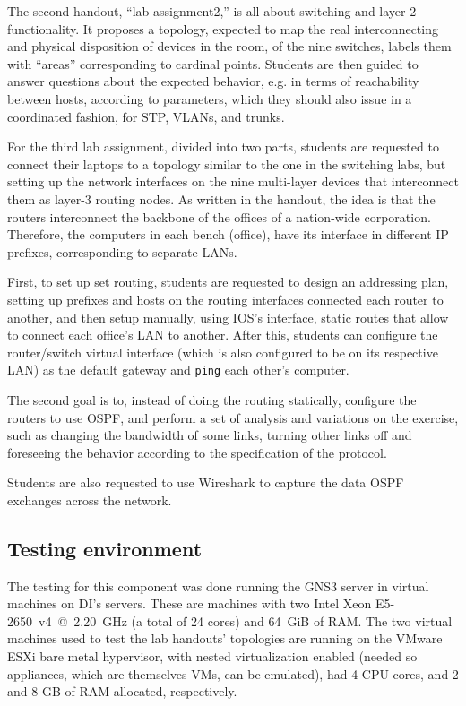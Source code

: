 The second handout, ``lab-assignment2,'' is all about switching and layer-2 functionality.
It proposes a topology, expected to map the real interconnecting and physical disposition of devices in the room, of the nine switches, labels them with ``areas'' corresponding to cardinal points.
Students are then guided to answer questions about the expected behavior, e.g. in terms of reachability between hosts, according to parameters, which they should also issue in a coordinated fashion, for STP, VLANs, and trunks.

For the third lab assignment, divided into two parts, students are requested to connect their laptops to a topology similar to the one in the switching labs, but setting up the network interfaces on the nine multi-layer devices that interconnect them as layer-3 routing nodes.
As written in the handout, the idea is that the routers interconnect the backbone of the offices of a nation-wide corporation.
Therefore, the computers in each bench (office), have its interface in different IP prefixes, corresponding to separate LANs. %

First, to set up set routing, students are requested to design an addressing plan, setting up prefixes and hosts on the routing interfaces connected each router to another, and then setup manually, using IOS's interface, static routes that allow to connect each office's LAN to another.
After this, students can configure the router/switch virtual interface (which is also configured to be on its respective LAN) as the default gateway and \texttt{ping} each other's computer.

The second goal is to, instead of doing the routing statically, configure the routers to use OSPF, and perform a set of analysis and variations on the exercise, such as changing the bandwidth of some links, turning other links off and foreseeing the behavior according to the specification of the protocol.

Students are also requested to use Wireshark to capture the data OSPF exchanges across the network.

\subsection{Testing environment}
\label{subsec:environment}

The testing for this component was done running the GNS3 server in virtual machines on DI's servers. %
These are machines with two Intel Xeon E5-2650~v4~@~2.20~GHz (a total of 24 cores) and 64~GiB of RAM.
The two virtual machines used to test the lab handouts' topologies are running on the VMware ESXi bare metal hypervisor, with nested virtualization enabled (needed so appliances, which are themselves VMs, can be emulated), had 4 CPU cores, and 2 and 8 GB of RAM allocated, respectively.

